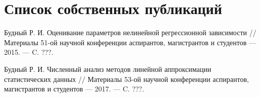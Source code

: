 \chapter*{Список собственных публикаций}

\noindent [1"---A] Будный Р. И.
Оценивание параметров нелинейной регрессионной
\hspace*{14mm} зависимости // Материалы 51-ой научной конференции аспирантов,
\hspace*{15mm} магистрантов и студентов --- 2015. --- C. {\color{red}???}.

\noindent [2"---A] Будный Р. И.
Численный анализ методов линейной аппроксимации
\hspace*{14mm} статистических данных // Материалы 53-ой научной конференции
\hspace*{15mm} аспирантов, магистрантов и студентов --- 2017. --- C. {\color{red}???}.





